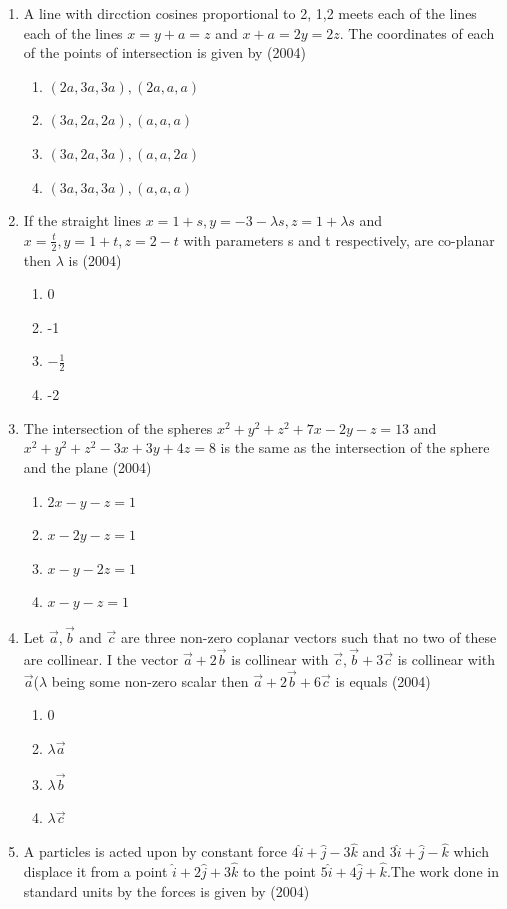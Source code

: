 \documentclass[12pt]{article}
\begin{document}
\begin{enumerate}
\begin{enumerate}
\end{enumerate}
\item A line with dircction cosines proportional to 2, 1,2 meets each of the lines each of the lines $x=y+a=z$ and $x+a=2y=2z$. The coordinates of each of the points of intersection is given by (2004)
\begin{enumerate}
\item $(2a,3a,3a),(2a,a,a)$
\item $(3a,2a,2a),(a,a,a)$
\item $(3a,2a,3a),(a,a,2a)$
\item $(3a,3a,3a),(a,a,a)$
\end{enumerate}
\item If the straight lines $x=1+s,y=-3-\lambda s,z=1+\lambda s$ and $x=\frac{t}{2},y=1+t,z=2-t$ with parameters s and t respectively, are co-planar then $\lambda$ is (2004)
\begin{enumerate}
\item 0
\item -1
\item $-\frac{1}{2}$
\item -2
\end{enumerate}
\item The intersection of the spheres $x^2+y^2+z^2+7x-2y-z=13$ and $x^2+y^2+z^2-3x+3y+4z=8$ is the same as the intersection of the sphere and the plane (2004)
\begin{enumerate}
\item $2x-y-z=1$
\item $x-2y-z=1$
\item $x-y-2z=1$
\item $x-y-z=1$
\end{enumerate}
\item Let $\vec{a},\vec{b}$ and $\vec{c}$ are three non-zero coplanar vectors such that no two of these are collinear. I the vector $\vec{a}+2\vec{b}$ is collinear with $\vec{c},\vec{b}+3\vec{c}$ is collinear with $\vec{a}$($\lambda$ being some non-zero scalar then $\vec{a}+2\vec{b}+6\vec{c}$ is equals (2004)
\begin{enumerate}
\item 0
\item $\lambda \vec{a}$
\item $\lambda \vec{b}$
\item $\lambda \vec{c}$
\end{enumerate} 
\item A particles is acted upon by constant force $4\hat{i}+\hat{j}-3\hat{k}$ and $3\hat{i}+\hat{j}-\hat{k}$ which displace it from a point $\hat{i}+2\hat{j}+3\hat{k}$ to the point $5\hat{i}+4\hat{j}+\hat{k}$.The work done in standard units by the forces is given by (2004)

\end{enumerate}
\end{document}
